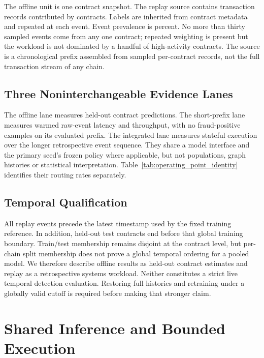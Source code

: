 \documentclass[10pt,journal]{IEEEtran}
\begin{document}
The offline unit is one contract snapshot. The replay source contains \StreamEvents{} transaction records contributed by \UniqueContracts{} contracts. Labels are inherited from contract metadata and repeated at each event. Event prevalence is \EventPrevalence{} percent. No more than thirty sampled events come from any one contract; repeated weighting is present but the workload is not dominated by a handful of high-activity contracts. The source is a chronological prefix assembled from sampled per-contract records, not the full transaction stream of any chain.

\subsection{Three Noninterchangeable Evidence Lanes}
The offline lane measures held-out contract predictions. The short-prefix lane measures warmed raw-event latency and throughput, with no fraud-positive examples on its evaluated prefix. The integrated lane measures stateful execution over the longer retrospective event sequence. They share a model interface and the primary seed's frozen policy where applicable, but not populations, graph histories or statistical interpretation. Table~\ref{tab:operating_point_identity} identifies their routing rates separately.


\subsection{Temporal Qualification}
All replay events precede the latest timestamp used by the fixed training reference. In addition, \EarlyTestContracts{} held-out test contracts end before that global training boundary. Train/test membership remains disjoint at the contract level, but per-chain split membership does not prove a global temporal ordering for a pooled model. We therefore describe offline results as held-out contract estimates and replay as a retrospective systems workload. Neither constitutes a strict live temporal detection evaluation. Restoring full histories and retraining under a globally valid cutoff is required before making that stronger claim.

\section{Shared Inference and Bounded Execution}
\end{document}
